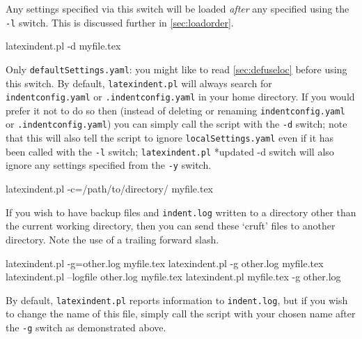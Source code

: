 	Any settings specified via this switch will be loaded \emph{after} any specified using
	the \texttt{-l} switch. This is discussed further in \vref{sec:loadorder}.
	\begin{commandshell}
latexindent.pl -d myfile.tex
\end{commandshell}

	Only \texttt{defaultSettings.yaml}: you might like to read \cref{sec:defuseloc} before
	using this switch. By default, \texttt{latexindent.pl} will always search for
	\texttt{indentconfig.yaml} or \texttt{.indentconfig.yaml} in your home directory. If you
	would prefer it not to do so then (instead of deleting or renaming
	\texttt{indentconfig.yaml} or \texttt{.indentconfig.yaml}) you can simply call the script
	with the \texttt{-d} switch; note that this will also tell the script to ignore
	\texttt{localSettings.yaml} even if it has been called with the \texttt{-l} switch;
	\texttt{latexindent.pl}%
	*{updated -d switch} will also ignore any settings specified from the \texttt{-y} switch.

	\begin{commandshell}
latexindent.pl -c=/path/to/directory/ myfile.tex
\end{commandshell}

	If you wish to have backup files and \texttt{indent.log} written to a directory other
	than the current working directory, then you can send these `cruft' files to another
	directory. Note the use of a trailing forward slash. %

	\begin{commandshell}
latexindent.pl -g=other.log myfile.tex
latexindent.pl -g other.log myfile.tex
latexindent.pl --logfile other.log myfile.tex
latexindent.pl myfile.tex -g other.log 
\end{commandshell}

	By default, \texttt{latexindent.pl} reports information to \texttt{indent.log}, but if
	you wish to change the name of this file, simply call the script with your chosen name
	after the \texttt{-g} switch as demonstrated above.

